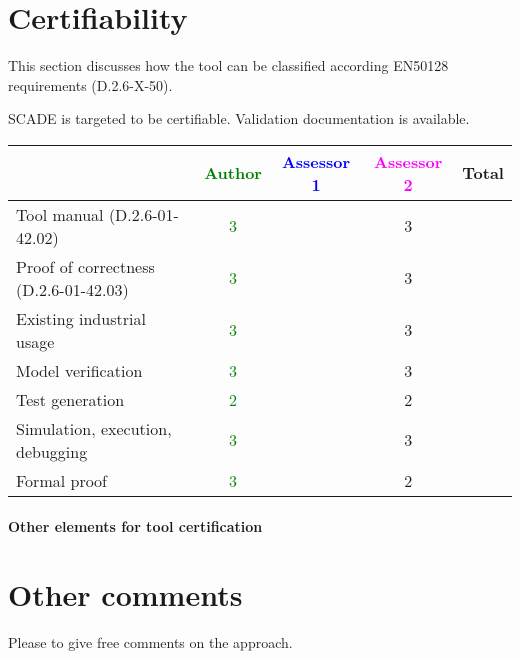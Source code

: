 \section{Certifiability}

This section discusses how the tool can be classified according EN50128 requirements (D.2.6-X-50).

\begin{author_comment}
SCADE is targeted to be certifiable. Validation documentation is available.   
\end{author_comment}


\begin{tabular}{|l | c | c | c | c|}
\hline
& \textcolor{green}{Author} & \textcolor{blue}{Assessor 1} & \textcolor{magenta}{Assessor 2} & Total \\
\hline 
Tool manual (D.2.6-01-42.02) & \textcolor{green}{3} & &3 &  \\
\hline
Proof of correctness (D.2.6-01-42.03)   & \textcolor{green}{3} & &3 & \\
\hline
Existing industrial  usage  & \textcolor{green}{3} & &3 & \\
\hline
Model verification & \textcolor{green}{3} & &3 & \\
\hline
Test generation & \textcolor{green}{2} & &2 & \\
\hline
Simulation, execution, debugging & \textcolor{green}{3} & &3 & \\
\hline
Formal proof & \textcolor{green}{3} & &2 & \\
\hline
\end{tabular}

\paragraph{Other elements for tool certification}

\section{Other comments}
Please to  give free comments on the approach.



